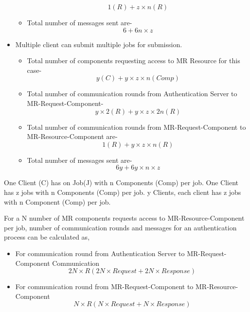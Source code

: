 \documentclass[oneside,a4paper,12pt]{pictreport}
\begin{document}
\begin{itemize}
\begin{itemize}
\begin{equation}
1(R) + z \times n(R)
\end{equation}
\item Total number of messages sent are-
\begin{equation}
6 + 6n \times z
\end{equation}
\end{itemize}
\item Multiple client can submit multiple jobs for submission.
\begin{itemize}
\item Total number of components requesting access to MR Resource for this case-
\begin{equation}
y(C) + y \times z \times n(Comp)
\end{equation}
\item Total number of communication rounds from Authentication Server to MR-Request-Component-
\begin{equation}
y \times 2(R) + y \times z \times 2n(R)
\end{equation}
\item Total number of communication rounds from MR-Request-Component to MR-Resource-Component are-
\begin{equation}
1(R) + y \times z \times n(R)
\end{equation}
\item Total number of messages sent are-
\begin{equation}
6y + 6y \times n \times z
\end{equation}
\end{itemize}
\end{itemize}
One Client (C) has on Job(J) with n Components (Comp) per job. One Client has z jobs with n Components (Comp) per job. y Clients, each client has z jobs with n Component (Comp) per job. 
\par For a N number of MR components requests access to MR-Resource-Component per job,
number of communication rounds and messages for an authentication process can be calculated as,
\begin{itemize}
\item For communication round from Authentication Server to MR-Request-Component Communication
\begin{equation}
2N \times R (2N \times Request + 2N \times Response)
\end{equation}
\item For communication round from MR-Request-Component to MR-Resource-Component
\begin{equation}
N \times R (N \times Request + N \times Response)
\end{equation}
\end{itemize}
\end{document}
